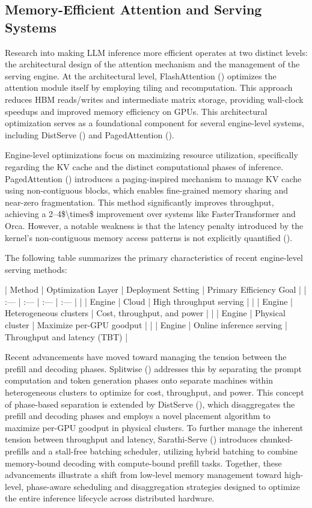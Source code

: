 \documentclass[11pt]{article}
\begin{document}
\subsection{Memory-Efficient Attention and Serving Systems}

Research into making LLM inference more efficient operates at two distinct levels: the architectural design of the attention mechanism and the management of the serving engine. At the architectural level, FlashAttention (\citep{2205.14135}) optimizes the attention module itself by employing tiling and recomputation. This approach reduces HBM reads/writes and intermediate matrix storage, providing wall-clock speedups and improved memory efficiency on GPUs. This architectural optimization serves as a foundational component for several engine-level systems, including DistServe (\citep{2401.09670}) and PagedAttention (\citep{2309.06180}).

Engine-level optimizations focus on maximizing resource utilization, specifically regarding the KV cache and the distinct computational phases of inference. PagedAttention (\citep{2309.06180}) introduces a paging-inspired mechanism to manage KV cache using non-contiguous blocks, which enables fine-grained memory sharing and near-zero fragmentation. This method significantly improves throughput, achieving a 2–4\$\textbackslash{}times\$ improvement over systems like FasterTransformer and Orca. However, a notable weakness is that the latency penalty introduced by the kernel's non-contiguous memory access patterns is not explicitly quantified (\citep{2309.06180}).

The following table summarizes the primary characteristics of recent engine-level serving methods:

| Method | Optimization Layer | Deployment Setting | Primary Efficiency Goal |
| :--- | :--- | :--- | :--- |
| \citep{2309.06180} | Engine | Cloud | High throughput serving |
| \citep{2311.18677} | Engine | Heterogeneous clusters | Cost, throughput, and power |
| \citep{2401.09670} | Engine | Physical cluster | Maximize per-GPU goodput |
| \citep{2403.02310} | Engine | Online inference serving | Throughput and latency (TBT) |

Recent advancements have moved toward managing the tension between the prefill and decoding phases. Splitwise (\citep{2311.18677}) addresses this by separating the prompt computation and token generation phases onto separate machines within heterogeneous clusters to optimize for cost, throughput, and power. This concept of phase-based separation is extended by DistServe (\citep{2401.09670}), which disaggregates the prefill and decoding phases and employs a novel placement algorithm to maximize per-GPU goodput in physical clusters. To further manage the inherent tension between throughput and latency, Sarathi-Serve (\citep{2403.02310}) introduces chunked-prefills and a stall-free batching scheduler, utilizing hybrid batching to combine memory-bound decoding with compute-bound prefill tasks. Together, these advancements illustrate a shift from low-level memory management toward high-level, phase-aware scheduling and disaggregation strategies designed to optimize the entire inference lifecycle across distributed hardware.
\end{document}

